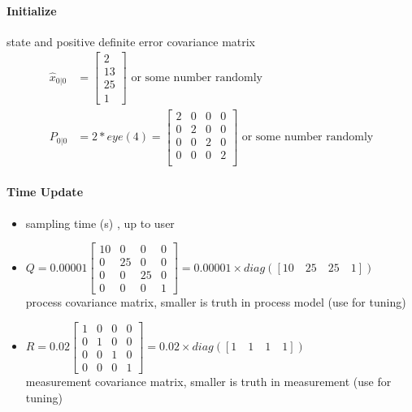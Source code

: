 	\paragraph{Initialize} state and positive definite error covariance matrix
	\[\begin{split}
		\hat{x}_{0|0} &= \begin{bmatrix}
			2 \\
			13 \\
			25 \\
			1
		\end{bmatrix} \text{ or some number randomly}\\
		P_{0|0} &= 2*eye(4) = 
		\begin{bmatrix}
			2 & 0 & 0 & 0 \\
			0 & 2 & 0 & 0 \\
			0 & 0 & 2 & 0 \\
			0 & 0 & 0 & 2 \\
		\end{bmatrix} \text{ or some number randomly}
	\end{split}\]
	
	\paragraph{Time Update}
	\begin{itemize}
		\item { sampling time (s) , up to user}
		\item \(Q = 0.00001
		\begin{bmatrix}
			10 & 0  & 0  & 0 \\
			0  & 25 & 0  & 0 \\
			0  & 0  & 25 & 0 \\
			0  & 0  & 0  & 1 
		\end{bmatrix} 
		= 0.00001 \times diag([10\quad 25\quad 25\quad 1])\) \\process covariance matrix, smaller is truth in process model (use for tuning)
		\item \(R = 0.02
		\begin{bmatrix}
			1 & 0 & 0 & 0 \\
			0 & 1 & 0 & 0 \\
			0 & 0 & 1 & 0 \\
			0 & 0 & 0 & 1 
		\end{bmatrix} 
		= 0.02 \times diag([1\quad 1\quad 1\quad 1])\) \\measurement covariance matrix, smaller is truth in measurement (use for tuning)
	\end{itemize}
